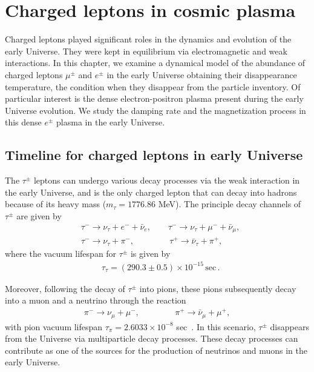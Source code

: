 \section{Charged leptons in cosmic plasma}\label{Electron}

Charged leptons played significant roles in the dynamics and evolution of the early Universe. They were kept in equilibrium via electromagnetic and weak interactions.  In this chapter, we examine a dynamical model of the abundance of charged leptons $\mu^\pm$ and $e^\pm$ in the early Universe obtaining their disappearance temperature, the condition when they disappear from the particle inventory. Of particular interest is the dense electron-positron plasma present during the early Universe evolution. We study the damping rate and the magnetization process in this dense $e^\pm$ plasma in the early Universe.

\subsection{Timeline for charged leptons in early Universe}

The $\tau^\pm$ leptons can undergo various decay processes via the weak interaction in the early Universe, and is the only charged lepton that can decay into hadrons because of its heavy mass ($m_\tau=1776.86$ MeV). The principle decay channels of $\tau^\pm$ are given by
\begin{align}
&\tau^-\rightarrow\nu_\tau+e^-+\bar{\nu}_e,\qquad \tau^-\rightarrow\nu_\tau+\mu^-+\bar{\nu}_\mu,\\
&\tau^-\rightarrow\nu_\tau+\pi^-,\qquad\qquad\,\tau^+\rightarrow\bar{\nu}_\tau+\pi^+,
\end{align}
 where the vacuum lifespan for $\tau^\pm$ is given by ~\cite{ParticleDataGroup:2022pth}
\begin{align}
&\tau_{\tau}=(290.3\pm0.5)\times10^{-15}\,\mathrm{sec}\,.
\end{align}

Moreover, following the decay of $\tau^\pm$ into pions, these pions subsequently decay into a muon and a neutrino through the reaction
\begin{align}
\pi^-\rightarrow\nu_\mu+\mu^-,\qquad\qquad\,\pi^+\rightarrow\bar{\nu}_\mu+\mu^+,
\end{align}
with pion vacuum lifespan $\tau_\pi=2.6033\times10^{-8}$ sec~\cite{ParticleDataGroup:2022pth}.
In this scenario, $\tau^\pm$ disappears from the Universe via multiparticle decay processes.
These decay processes can contribute as one of the sources for the production of neutrinos and muons in the early Universe.

